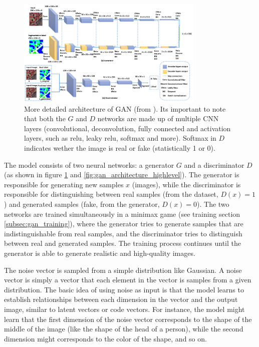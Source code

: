 \begin{figure}
    \centering
    \includegraphics[width=0.8\textwidth]{images/gan/gan_architecture.png}
    \caption{More detailed architecture of GAN (from \cite{gan_architecture_figure_paper}). Its important to note that both the $G$ and $D$ networks are made up of multiple CNN layers (convolutional, deconvolution, fully connected and activation layers, such as relu, leaky relu, softmax and more). Softmax in $D$ indicates wether the image is real or fake (statistically 1 or 0).}
    \label{fig:gan_architecture}
\end{figure}

The model consists of two neural networks: a generator $G$ and a discriminator $D$ (as shown in figure \ref{fig:gan_architecture} and \ref{fig:gan_architecture_highlevel}). The generator is responsible for generating new samples $x$ (images), while the discriminator is responsible for distinguishing between real samples (from the dataset, $D(x) = 1$) and generated samples (fake, from the generator, $D(x) = 0$). The two networks are trained simultaneously in a minimax game (see training section \ref{subsec:gan_training}), where the generator tries to generate samples that are indistinguishable from real samples, and the discriminator tries to distinguish between real and generated samples. The training process continues until the generator is able to generate realistic and high-quality images. 

The noise vector is sampled from a simple distribution like Gaussian. A noise vector is simply a vector that each element in the vector is samples from a given distribution. The basic idea of using noise as input is that the model learns to establish relationships between each dimension in the vector and the output image, similar to latent vectors or code vectors. For instance, the model might learn that the first dimension of the noise vector corresponds to the shape of the middle of the image (like the shape of the head of a person), while the second dimension might corresponds to the color of the shape, and so on.

